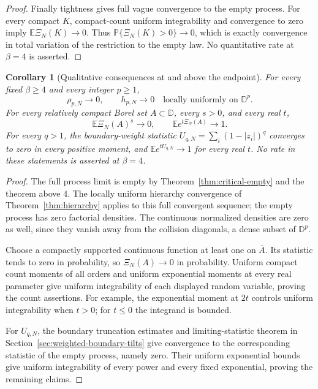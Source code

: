 \documentclass[11pt,a4paper]{article}
\numberwithin{equation}{section}
\newtheorem{corollary}[theorem]{Corollary}
\theoremstyle{definition}
\theoremstyle{remark}
\newcommand{\D}{\mathbb D}
\newcommand{\E}{\mathbb E}
\newcommand{\Pbb}{\mathbb P}
\begin{document}
\begin{proof}
Finally tightness gives full vague convergence to the empty process.
For every compact $K$, compact-count uniform integrability and
convergence to zero imply $\E\Xi_N(K)\to0$. Thus
$\Pbb\{\Xi_N(K)>0\}\to0$, which is exactly convergence in total
variation of the restriction to the empty law. No quantitative rate
at $\beta=4$ is asserted.
\end{proof}


\begin{corollary}[Qualitative consequences at and above the endpoint]
\label{cor:critical-empty-consequences}
For every fixed $\beta\ge4$ and every integer $p\ge1$,
\[
 \rho_{p,N}\longrightarrow0,\qquad h_{p,N}\longrightarrow0
 \quad\text{locally uniformly on }\D^p.
\]
For every relatively compact Borel set $A\subset\D$, every $s>0$,
and every real $t$,
\[
 \E\Xi_N(A)^s\longrightarrow0,\qquad
 \E e^{t\Xi_N(A)}\longrightarrow1.
\]
For every $q>1$, the boundary-weight statistic
$U_{q,N}=\sum_i(1-|z_i|)^q$ converges to zero in every positive
moment, and $\E e^{tU_{q,N}}\to1$ for every real $t$.
No rate in these statements is asserted at $\beta=4$.
\end{corollary}

\begin{proof}
The full process limit is empty by Theorem~\ref{thm:critical-empty}
and the theorem above $4$. The locally uniform hierarchy convergence
of Theorem~\ref{thm:hierarchy} applies to this full convergent sequence;
the empty process has zero factorial densities. The continuous
normalized densities are zero as well, since they vanish away from
the collision diagonals, a dense subset of $\D^p$.

Choose a compactly supported continuous function at least one on
$\overline A$. Its statistic tends to zero in probability, so
$\Xi_N(A)\to0$ in probability. Uniform compact count moments of
all orders and uniform exponential moments at every real parameter
give uniform integrability of each displayed random variable, proving
the count assertions. For example, the exponential moment at $2t$
controls uniform integrability when $t>0$; for $t\le0$ the integrand
is bounded.

For $U_{q,N}$, the boundary truncation estimates and limiting-statistic
theorem in Section~\ref{sec:weighted-boundary-tilts} give convergence
to the corresponding statistic of the empty process, namely zero.
Their uniform exponential bounds give uniform integrability of every
power and every fixed exponential, proving the remaining claims.
\end{proof}
\end{document}
